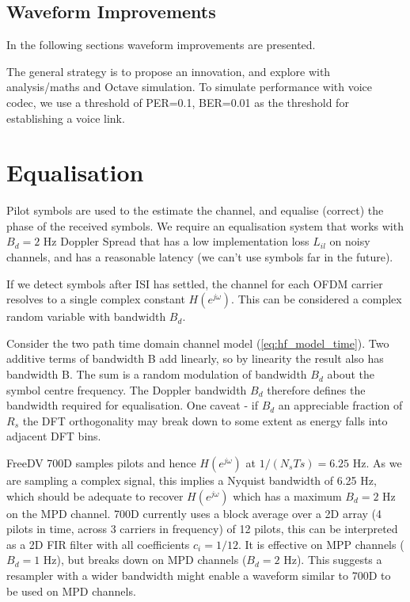 \documentclass{article}
\begin{document}
\subsection{Waveform Improvements}

In the following sections waveform improvements are presented.

The general strategy is to propose an innovation, and explore with analysis/maths and Octave simulation. To simulate performance with voice codec, we use a threshold of PER=0.1, BER=0.01 as the threshold for establishing a voice link.

\section{Equalisation}

Pilot symbols are used to the estimate the channel, and equalise (correct) the phase of the received symbols.  We require an equalisation system that works with $B_d=2$ Hz Doppler Spread that has a low implementation loss $L_{il}$ on noisy channels, and has a reasonable latency (we can't use symbols far in the future).

If we detect symbols after ISI has settled, the channel for each OFDM carrier resolves to a single complex constant $H(e^{j \omega})$. This can be considered a complex random variable with bandwidth $B_d$. 

Consider the two path time domain channel model (\ref{eq:hf_model_time}). Two additive terms of bandwidth B add linearly, so by linearity the result also has bandwidth B.  The sum is a random modulation of bandwidth $B_d$ about the symbol centre frequency.  The Doppler bandwidth $B_d$ therefore defines the bandwidth required for equalisation. One caveat - if $B_d$ an appreciable fraction of $R_s$ the DFT orthogonality may break down to some extent as energy falls into adjacent DFT bins.

FreeDV 700D samples pilots and hence $H(e^{j \omega})$ at $1/(N_sTs)=6.25$ Hz.  As we are sampling a complex signal, this implies a Nyquist bandwidth of 6.25 Hz, which should be adequate to recover $H(e^{j \omega})$ which has a maximum $B_d=2$ Hz on the MPD channel. 700D currently uses a block average over a 2D array (4 pilots in time, across 3 carriers in frequency) of 12 pilots, this can be interpreted as a 2D FIR filter with all coefficients $c_i=1/12$. It is effective on MPP channels ($B_d=1$ Hz), but breaks down on MPD channels ($B_d=2$ Hz).  This suggests a resampler with a wider bandwidth might enable a waveform similar to 700D to be used on MPD channels.
\end{document}
